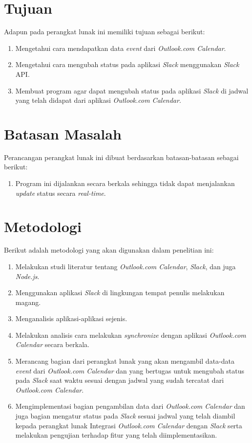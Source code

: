 \section{Tujuan}
\label{sec:tujuan}
Adapun pada perangkat lunak ini memiliki tujuan sebagai berikut:
\begin{enumerate}
	\item Mengetahui cara mendapatkan data \textit{event} dari \textit{Outlook.com Calendar}.   
	\item Mengetahui cara mengubah status pada aplikasi \textit{Slack} menggunakan \textit{Slack} API. 
	\item Membuat program agar dapat mengubah status pada aplikasi \textit{Slack} di jadwal yang telah didapat dari aplikasi \textit{Outlook.com Calendar}.  
	
\end{enumerate}

\section{Batasan Masalah}
\label{sec:batasan}
Perancangan perangkat lunak ini dibuat berdasarkan batasan-batasan sebagai berikut: 
\begin{enumerate}
	\item Program ini dijalankan secara berkala sehingga tidak dapat menjalankan \textit{update} status secara \textit{real-time}. 
\end{enumerate}

\section{Metodologi}
\label{sec:metlit}
Berikut adalah metodologi yang akan digunakan dalam penelitian ini: 
\begin{enumerate}
	\item Melakukan studi literatur tentang \textit{Outlook.com Calendar}, \textit{Slack}, dan juga \textit{Node.js}.
	\item Menggunakan aplikasi \textit{Slack} di lingkungan tempat penulis melakukan magang. 
	\item Menganalisis aplikasi-aplikasi sejenis. 
	\item Melakukan analisis cara melakukan \textit{synchronize} dengan aplikasi \textit{Outlook.com Calendar} secara berkala. 
	\item Merancang bagian dari perangkat lunak yang akan mengambil data-data \textit{event} dari \textit{Outlook.com Calendar} dan yang bertugas untuk mengubah status pada \textit{Slack} saat waktu sesuai dengan jadwal yang sudah tercatat dari \textit{Outlook.com Calendar}.
	\item Mengimplementasi bagian pengambilan data dari \textit{Outlook.com Calendar} dan juga bagian mengatur status pada \textit{Slack} sesuai jadwal yang telah diambil kepada perangkat lunak Integrasi \textit{Outlook.com Calendar} dengan \textit{Slack} serta melakukan pengujian terhadap fitur yang telah diimplementasikan.
\end{enumerate}

